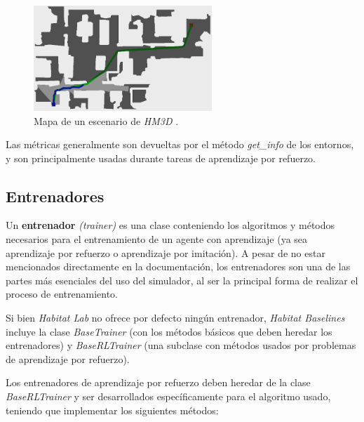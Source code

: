 \begin{itemize}
\begin{figure}[h]
    \centering
    \includegraphics[width=0.6\textwidth]{imagenes/cap4/topdownmap.png}
    \caption{Mapa de un escenario de \textit{HM3D} \cite{habitatmp3d}.}
    \label{fig:chap4-topdownmap}
\end{figure}			
	
\end{itemize}

Las métricas generalmente son devueltas por el método \textit{get{\_}info} de los entornos, y son principalmente usadas durante tareas de aprendizaje por refuerzo.

\subsection{Entrenadores}

Un \textbf{entrenador} \textit{(trainer)} es una clase conteniendo los algoritmos y métodos necesarios para el entrenamiento de un agente con aprendizaje (ya sea aprendizaje por refuerzo o aprendizaje por imitación). A pesar de no estar mencionados directamente en la documentación, los entrenadores son una de las partes más esenciales del uso del simulador, al ser la principal forma de realizar el proceso de entrenamiento.

Si bien \textit{Habitat Lab} no ofrece por defecto ningún entrenador, \textit{Habitat Baselines} incluye la clase \textit{BaseTrainer} (con los métodos básicos que deben heredar los entrenadores) y \textit{BaseRLTrainer} (una subclase con métodos usados por problemas de aprendizaje por refuerzo).

Los entrenadores de aprendizaje por refuerzo deben heredar de la clase \textit{BaseRLTrainer} y ser desarrollados específicamente para el algoritmo usado, teniendo que implementar los siguientes métodos:

